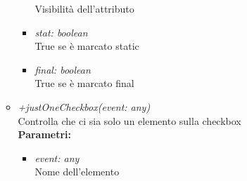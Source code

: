\begin{itemize}
\begin{itemize}
\begin{itemize}
    			Visibilità dell'attributo
    			\item \emph{stat: boolean}\\
    			True se è marcato static
    			\item \emph{final: boolean}\\
    			True se è marcato final
    		\end{itemize}
    		\item \emph{+justOneCheckbox(event: any)}\\
    		Controlla che ci sia solo un elemento sulla checkbox\\
    		\textbf{Parametri:}
    		\begin{itemize}
    			\item \emph{event: any}\\
    			Nome dell'elemento
    		\end{itemize}
		\end{itemize}
\end{itemize}